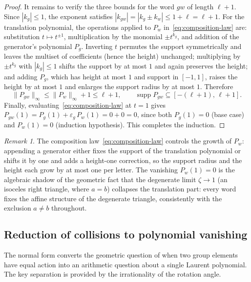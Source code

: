 \documentclass[11pt]{article}
\theoremstyle{plain}
\theoremstyle{definition}
\theoremstyle{remark}
\newtheorem{remark}[theorem]{Remark}
\begin{document}
\begin{proof}
It remains to verify the three bounds for the word $gw$ of length
$\ell + 1$. Since $|k_g| \le 1$, the exponent satisfies
$|k_{gw}| = |k_g \pm k_w| \le 1 + \ell = \ell + 1$. For the translation
polynomial, the operations applied to $P_w$ in~\eqref{eq:composition-law}
are: substitution $t \mapsto t^{\pm 1}$, multiplication by the monomial
$\pm t^{k_g}$, and addition of the generator's polynomial $P_g$. Inverting
$t$ permutes the support symmetrically and leaves the multiset of
coefficients (hence the height) unchanged; multiplying by
$\pm t^{k_g}$ with $|k_g| \le 1$ shifts the support by at most $1$ and
again preserves the height; and adding $P_g$, which has height at most $1$
and support in $[-1,1]$, raises the height by at most $1$ and enlarges the
support radius by at most $1$. Therefore
\[
\|P_{gw}\|_\infty \le \|P_w\|_\infty + 1 \le \ell + 1,
\qquad
\operatorname{supp} P_{gw} \subseteq [-(\ell+1),\,\ell+1].
\]
Finally, evaluating~\eqref{eq:composition-law} at $t = 1$ gives
$P_{gw}(1) = P_g(1) + \varepsilon_g\, P_w(1) = 0 + 0 = 0$, since both
$P_g(1) = 0$ (base case) and $P_w(1) = 0$ (induction hypothesis). This
completes the induction.
\end{proof}

\begin{remark}
\label{rem:composition-law-meaning}
The composition law~\eqref{eq:composition-law} controls the growth of
$P_w$: appending a generator either fixes the support of the translation
polynomial or shifts it by one and adds a height-one correction, so the
support radius and the height each grow by at most one per letter. The
vanishing $P_w(1) = 0$ is the algebraic shadow of the geometric fact that
the degenerate limit $\zeta \to 1$ (an isoceles right triangle, where
$a = b$) collapses the translation part: every word fixes the affine
structure of the degenerate triangle, consistently with the exclusion
$a \ne b$ throughout.
\end{remark}

\subsection{Reduction of collisions to polynomial vanishing}

The normal form converts the geometric question of when two group
elements have equal action into an arithmetic question about a single
Laurent polynomial. The key separation is provided by the irrationality
of the rotation angle.
\end{document}
